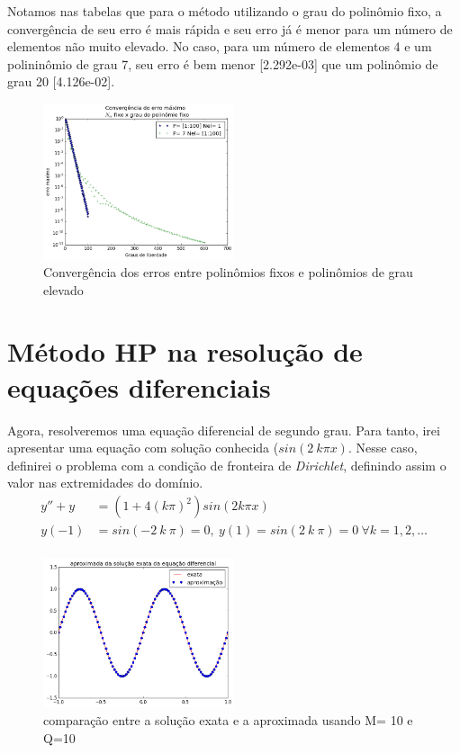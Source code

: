  Notamos nas tabelas  que para o método utilizando o grau do polinômio fixo, a convergência de seu erro é mais rápida  e seu erro já é menor para um número de elementos não muito elevado. No caso, para um número de elementos 4 e um polininômio de grau 7, seu erro é bem menor [2.292e-03] que um polinômio de grau 20 [4.126e-02].
 
\begin{figure}[!hb]
  \includegraphics[width=0.5\textwidth,center]{figuras/convergencia_erro_FEM2.png}
  \caption{Convergência dos erros entre polinômios fixos e polinômios de grau elevado}
\end{figure}

\section{Método HP na resolução de equações diferenciais}

 Agora, resolveremos uma equação diferencial de segundo grau. Para tanto, irei apresentar uma equação com solução conhecida ($sin(2\ k \pi x)$. Nesse caso, definirei o problema com a condição de fronteira de \emph{Dirichlet}, definindo assim o valor nas extremidades do domínio.
\begin{align}
y'' + y &= (1 + 4 (k \pi)^2)sin(2 k \pi x) \\
y(-1) &= sin(-2\ k \ \pi ) = 0 ,\ y(1) = sin(2\ k\ \pi) = 0 \ \forall k = 1,2,\dots \\
\end{align}	
 
\begin{figure}[!ht]
  \includegraphics[width=0.5\textwidth,center]{figuras/solu_edo_simul.png}
  \caption{comparação entre a solução exata e a aproximada usando M= 10 e Q=10}
\end{figure}

